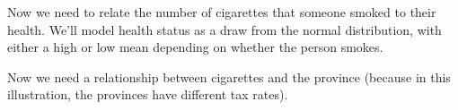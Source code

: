 \documentclass[
]{book}
\newenvironment{Shaded}{\begin{snugshade}}{\end{snugshade}}
\newcommand{\CommentTok}[1]{\textcolor[rgb]{0.56,0.35,0.01}{\textit{#1}}}
\newcommand{\DataTypeTok}[1]{\textcolor[rgb]{0.13,0.29,0.53}{#1}}
\newcommand{\DecValTok}[1]{\textcolor[rgb]{0.00,0.00,0.81}{#1}}
\newcommand{\KeywordTok}[1]{\textcolor[rgb]{0.13,0.29,0.53}{\textbf{#1}}}
\newcommand{\NormalTok}[1]{#1}
\newcommand{\OperatorTok}[1]{\textcolor[rgb]{0.81,0.36,0.00}{\textbf{#1}}}
\newcommand{\StringTok}[1]{\textcolor[rgb]{0.31,0.60,0.02}{#1}}
\begin{document}
Now we need to relate the number of cigarettes that someone smoked to their health. We'll model health status as a draw from the normal distribution, with either a high or low mean depending on whether the person smokes.

\begin{Shaded}
\end{Shaded}

Now we need a relationship between cigarettes and the province (because in this illustration, the provinces have different tax rates).
\end{document}
